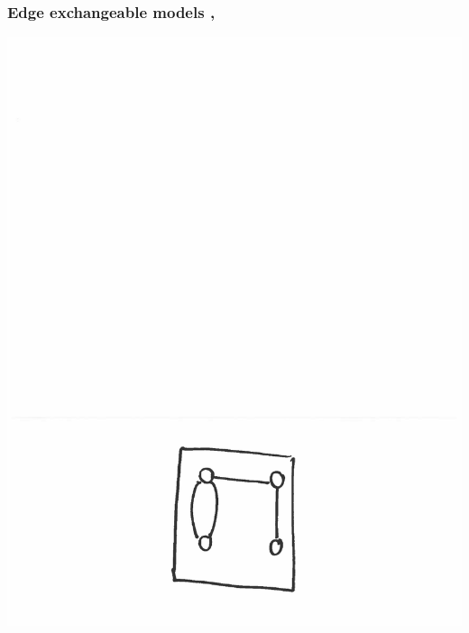 \documentclass[final,hyperref={pdfpagelabels=false},noamsthm]{beamer}
\begin{document}
\begin{frame}
	\frametitle{Edge exchangeable models \cite{cai2016}, \cite{CraneDempsey2017}}
	\includegraphics[angle=90,origin=c,scale=0.4]{fig/ee1}
\end{frame}
\end{document}
